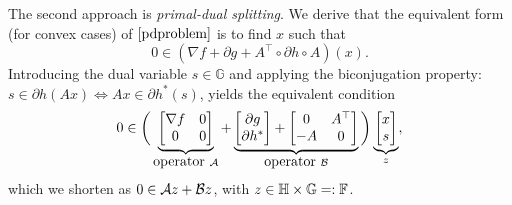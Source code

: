 {{{The second approach is \emph{primal-dual splitting}. %
}
We derive that the equivalent form (for convex cases) of $\eqref{pdproblem}$ is to find $x$ such that
\begin{equation}
0\in (\nabla f+\partial g+A^\top\circ\partial h\circ A)(x).
\end{equation}
Introducing the dual variable $s\in\mathbb{G}$ and applying the biconjugation property:  $s\in \partial h(Ax)\Leftrightarrow Ax\in \partial h^*(s)$, yields the equivalent condition
\begin{equation}
0\in\bigg(\underbrace{\begin{bmatrix}
\nabla f & 0\\
0 & 0
\end{bmatrix}}_{\mbox{operator}~\cA}+\underbrace{
\begin{bmatrix}
\partial g\\
\partial h^*
\end{bmatrix}+\begin{bmatrix}
0&A^\top\\
-A&0
\end{bmatrix}}_{\mbox{operator}~\cB}\bigg) \underbrace{\begin{bmatrix}
x\\
s
\end{bmatrix}}_{z},\label{pdkkt}
\end{equation}
which we shorten as $0\in{\mathcal{A}} z+{\mathcal{B}} z$, with $z\in\mathbb{H}\times\mathbb{G}=:\mathbb{F}$.

}}
